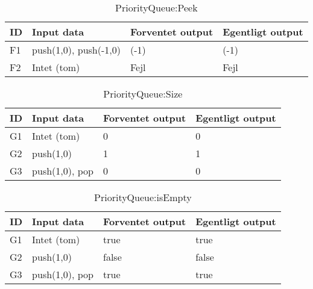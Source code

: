 \begin{table}[h!]
	\caption{PriorityQueue:Peek}
	\centering
	\begin{tabular}{L L L L}
		\hline\hline
		ID & Input data & Forventet output & Egentligt output \\ [0.375ex]
		\hline
		F1 & push(1,0), push(-1,0) & (-1) & (-1)\\
		F2 & Intet (tom) & Fejl & Fejl\\
		\hline
	\end{tabular}
\end{table}

\begin{table}[h!]
	\caption{PriorityQueue:Size}
	\centering
	\begin{tabular}{L L L L}
		\hline\hline
		ID & Input data & Forventet output & Egentligt output \\ [0.375ex]
		\hline
		G1 & Intet (tom) & 0 & 0\\
		G2 & push(1,0) & 1 & 1\\
		G3 & push(1,0), pop & 0 & 0\\
		\hline
	\end{tabular}
\end{table}

\begin{table}[h!]
	\caption{PriorityQueue:isEmpty}
	\centering
	\begin{tabular}{L L L L}
		\hline\hline
		ID & Input data & Forventet output & Egentligt output \\ [0.375ex]
		\hline
		G1 & Intet (tom) & true & true\\
		G2 & push(1,0) & false & false\\
		G3 & push(1,0), pop & true & true\\
		\hline
	\end{tabular}
\end{table}